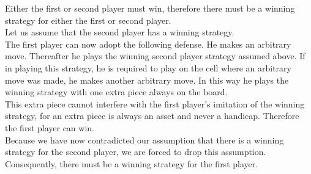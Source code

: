 \documentclass[12pt]{article}
\begin{document}
    Either the first or second player must win, therefore there must be a winning strategy for either the first or second player.\\
    Let us assume that the second player has a winning strategy.\\
    The first player can now adopt the following defense. He makes an arbitrary move. Thereafter he plays the winning second player strategy assumed above. If in playing this strategy, he is required to play on the cell where an arbitrary move was made, he makes another arbitrary move. In this way he plays the winning strategy with one extra piece always on the board.\\
    This extra piece cannot interfere with the first player's imitation of the winning strategy, for an extra piece is always an asset and never a handicap. Therefore the first player can win.\\
    Because we have now contradicted our assumption that there is a winning strategy for the second player, we are forced to drop this assumption.\\
    Consequently, there must be a winning strategy for the first player.\\




\end{document}
